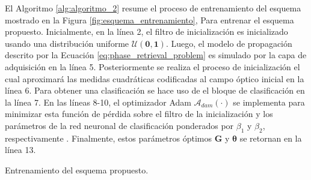 El Algoritmo \ref{alg:algoritmo_2} resume el proceso de entrenamiento del esquema mostrado en la Figura \ref{fig:esquema_entrenamiento},  Para entrenar el esquema propuesto. Inicialmente, en la línea 2, el filtro de inicialización es inicializado usando una distribución uniforme $\mathcal{U}(\mathbf{0},\mathbf{1})$. Luego, el modelo de propagación descrito por la Ecuación \eqref{eq:phase_retrieval_problem} es simulado por la capa de adquisición en la línea 5. Posteriormente se realiza el proceso de inicialización el cual aproximará las medidas cuadráticas codificadas al campo óptico inicial en la línea 6. Para obtener una clasificación se hace uso de el bloque de clasificación en la línea 7. En las líneas 8-10, el optimizador Adam $\mathcal{A}_{dam}(\cdot)$ se implementa para minimizar esta función de pérdida sobre el filtro de la inicialización y los parámetros de la red neuronal de clasificación ponderados por $\beta_1$ y $\beta_2$, respectivamente . Finalmente, estos parámetros óptimos $\mathbf{G}$ y $\boldsymbol{\theta}$ se retornan en la línea 13.
\begin{algorithm}[!h]
        \caption{Entrenamiento del esquema propuesto.}
            \label{alg:algoritmo_2}
        	\begin{algorithmic}[1]
                \EndFor
                \EndFor
	\end{algorithmic}
\end{algorithm}
